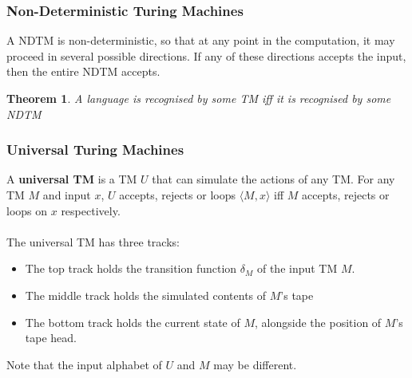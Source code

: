 \documentclass{article}
\newtheorem{thm}{Theorem}
\newcommand{\encode}[1]{\langle #1 \rangle}
\begin{document}
    \subsubsection{Non-Deterministic Turing Machines}
    A NDTM is non-deterministic, so that at any point in the computation, it may proceed in several possible directions. If any of these directions accepts the input, then the entire NDTM accepts. 
    \begin{thm}
        A language is recognised by some TM iff it is recognised by some NDTM
    \end{thm}
    \subsubsection{Universal Turing Machines}
    A \textbf{universal TM} is a TM $U$ that can simulate the actions of any TM. For any TM $M$ and input $x$, $U$ accepts, rejects or loops $\encode{M,x}$ iff $M$ accepts, rejects or loops on $x$ respectively.\\ \\
    The universal TM has three tracks:
    \begin{itemize}
        \item The top track holds the transition function $\delta_M$ of the input TM $M$.
        \item The middle track holds the simulated contents of $M$'s tape
        \item The bottom track holds the current state of $M$, alongside the position of $M$'s tape head. 
    \end{itemize}
    Note that the input alphabet of $U$ and $M$ may be different. 
\end{document}
